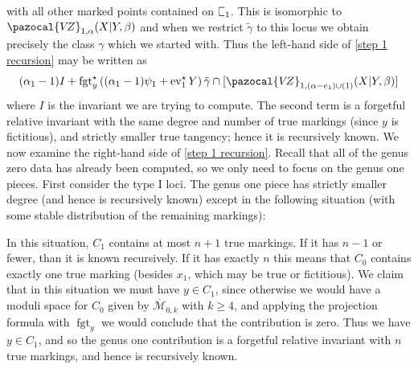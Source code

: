 \documentclass[11pt]{amsart}
\newcommand{\sqC}{\scalebox{0.8}[1.3]{$\sqsubset$}}
\newcommand{\VZ}{\pazocal{V\!Z}}
\newcommand{\st}{\star}
\newcommand{\ev}{\operatorname{ev}}
\newcommand{\fgt}{\operatorname{fgt}}
\newcommand{\Mcal}{\mathcal{M}}
\newcommand{\ol}[1]{\overline{#1}}
\theoremstyle{definition}
\theoremstyle{definition}
\begin{document}
with all other marked points contained on $\sqC_1$. This is isomorphic to $\VZ_{1,\alpha}(X|Y,\beta)$ and when we restrict $\tilde\gamma$ to this locus we obtain precisely the class $\gamma$ which we started with. Thus the left-hand side of \eqref{step 1 recursion} may be written as
\begin{equation*} (\alpha_1-1) I + \fgt_y^\st \left( (\alpha_1-1)\psi_1 + \ev_1^\st Y\right)  \tilde\gamma \cap [\VZ_{1,(\alpha-e_1)\cup(1)}(X|Y,\beta)]\end{equation*}
where $I$ is the invariant we are trying to compute. The second term is a forgetful relative invariant with the same degree and number of true markings (since $y$ is fictitious), and strictly smaller true tangency; hence it is recursively known. We now examine the right-hand side of \eqref{step 1 recursion}. Recall that all of the genus zero data has already been computed, so we only need to focus on the genus one pieces. First consider the type I loci. The genus one piece has strictly smaller degree (and hence is recursively known) except in the following situation (with some stable distribution of the remaining markings):
\begin{center}
\end{center}
In this situation, $C_1$ contains at most $n+1$ true markings. If it has $n-1$ or fewer, than it is known recursively. If it has exactly $n$ this means that $C_0$ contains exactly one true marking (besides $x_1$, which may be true or fictitious). We claim that in this situation we must have $y \in C_1$, since otherwise we would have a moduli space for $C_0$ given by $\ol\Mcal_{0,k}$ with $k \geq 4$, and  applying the projection formula with $\fgt_y$ we would conclude that the contribution is zero. Thus we have $y \in C_1$, and so the genus one contribution is a forgetful relative invariant with $n$ true markings, and hence is recursively known.
\end{document}
